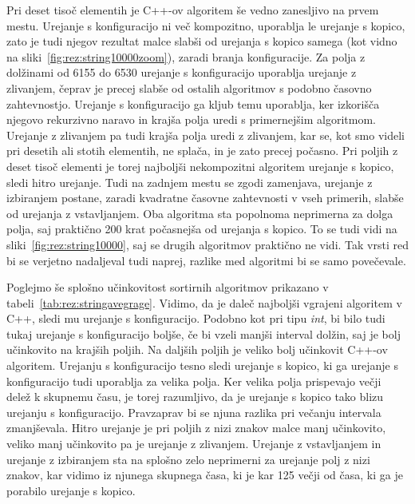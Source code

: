 \documentclass[a4paper,oneside,12pt]{article}
\begin{document}
Pri deset tisoč elementih je C++-ov algoritem še vedno zanesljivo na prvem mestu. Urejanje s 
konfiguracijo ni več kompozitno, uporablja le urejanje s kopico, zato je tudi
njegov rezultat malce slabši od urejanja s kopico samega (kot vidno na
sliki~\ref{fig:rez:string10000zoom}), zaradi branja
konfiguracije. Za polja z dolžinami od 6155 do 6530 urejanje s konfiguracijo uporablja
urejanje z zlivanjem, čeprav je precej slabše od ostalih algoritmov s podobno časovno zahtevnostjo. Urejanje s
konfiguracijo ga kljub temu uporablja, ker izkorišča njegovo rekurzivno naravo in krajša polja uredi s
primernejšim algoritmom. Urejanje z zlivanjem pa tudi krajša polja uredi z zlivanjem, kar se, kot smo 
videli pri desetih ali stotih elementih, ne splača, in je zato precej počasno.
Pri poljih z deset tisoč elementi je torej najboljši nekompozitni algoritem 
urejanje s kopico, sledi hitro urejanje. Tudi na zadnjem mestu se zgodi zamenjava, urejanje z izbiranjem
postane, zaradi kvadratne časovne zahtevnosti v vseh primerih, slabše od %
urejanja z vstavljanjem. Oba algoritma sta popolnoma neprimerna za dolga polja,
saj praktično 200 krat počasnejša od urejanja s kopico. To se tudi vidi na
sliki~\ref{fig:rez:string10000}, saj se drugih algoritmov praktično ne vidi.
Tak vrsti red bi se verjetno nadaljeval tudi naprej, razlike med algoritmi bi se
samo povečevale.

Poglejmo še splošno učinkovitost sortirnih algoritmov prikazano v
tabeli~\ref{tab:rez:stringavegrage}. Vidimo, da je daleč najboljši vgrajeni
algoritem v C++, sledi mu urejanje s konfiguracijo. Podobno kot pri tipu
\emph{int}, bi bilo tudi tukaj urejanje s konfiguracijo boljše, če bi vzeli
manjši interval dolžin, saj je bolj učinkovito na krajših poljih. Na daljših
poljih je veliko bolj učinkovit C++-ov algoritem. Urejanju s konfiguracijo tesno
sledi urejanje s kopico, ki ga urejanje s konfiguracijo tudi uporablja za velika
polja. Ker velika polja prispevajo večji delež k skupnemu času, je torej
razumljivo, da je urejanje s kopico tako blizu urejanju s konfiguracijo.
Pravzaprav bi se njuna razlika pri večanju intervala zmanjševala.
Hitro urejanje je pri poljih z nizi znakov malce manj učinkovito, veliko manj
učinkovito pa je urejanje z zlivanjem. Urejanje z vstavljanjem in urejanje z
izbiranjem sta na splošno zelo neprimerni za urejanje polj z nizi znakov, kar
vidimo iz njunega skupnega časa, ki je kar 125 večji od časa, ki ga je porabilo
urejanje s kopico.
\end{document}
